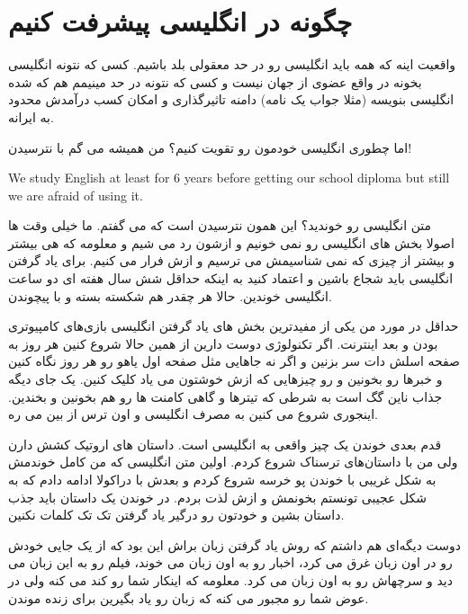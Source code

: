 \section{چگونه در انگلیسی پیشرفت کنیم}
واقعیت اینه که همه باید انگلیسی رو در حد معقولی بلد باشیم. کسی که نتونه انگلیسی بخونه در واقع عضوی از جهان نیست و کسی که نتونه در حد مینیمم هم که شده انگلیسی بنویسه (مثلا جواب یک نامه) دامنه تاثیرگذاری و امکان کسب درآمدش محدود به ایرانه.

اما چطوری انگلیسی خودمون رو تقویت کنیم؟ من همیشه می گم با نترسیدن!
\begin{frameng}
We study English at least for 6 years before getting our school diploma but still we are afraid of using it.
\end{frameng}
متن انگلیسی رو خوندید؟ این همون نترسیدن است که می گفتم. ما خیلی وقت ها اصولا بخش های انگلیسی رو نمی خونیم و ازشون رد می شیم و معلومه که هی بیشتر و بیشتر از چیزی که نمی شناسیمش می ترسیم و ازش فرار می کنیم. برای یاد گرفتن انگلیسی باید شجاع باشین و اعتماد کنید به اینکه حداقل شش سال هفته ای دو ساعت انگلیسی خوندین. حالا هر چقدر هم شکسته بسته و با پیچوندن.

حداقل در مورد من یکی از مفیدترین بخش های یاد گرفتن انگلیسی بازی‌های کامپیوتری بودن و بعد اینترنت. اگر تکنولوژی دوست دارین از همین حالا شروع کنین هر روز به صفحه اسلش دات
سر بزنین و اگر نه جاهایی مثل صفحه اول یاهو رو هر روز نگاه کنین و خبرها رو بخونین و رو چیزهایی که ازش خوشتون می یاد کلیک کنین. یک جای دیگه جذاب ناین گگ
است به شرطی که تیترها و گاهی کامنت ها رو هم بخونین و بخندین. اینجوری شروع می کنین به مصرف انگلیسی و اون ترس از بین می ره. 

قدم بعدی خوندن یک چیز واقعی به انگلیسی است. داستان های اروتیک کشش دارن ولی من با داستان‌های ترسناک شروع کردم. اولین متن انگلیسی که من کامل خوندمش به شکل غریبی با خوندن پو خرسه
شروع کردم و بعدش با دراکولا
 ادامه دادم که به شکل عجیبی تونستم بخونمش و ازش لذت بردم.
 در خوندن یک داستان باید جذب داستان بشین و خودتون رو درگیر یاد گرفتن تک تک کلمات نکنین.

دوست دیگه‌ای هم داشتم که روش یاد گرفتن زبان براش این بود که از یک جایی خودش رو در اون زبان غرق می کرد، اخبار رو به اون زبان می خوند، فیلم رو به این زبان می دید و سرچهاش رو به اون زبان می کرد. معلومه که اینکار شما رو کند می کنه ولی در عوض شما رو مجبور می کنه که زبان رو یاد بگیرین برای زنده موندن.


